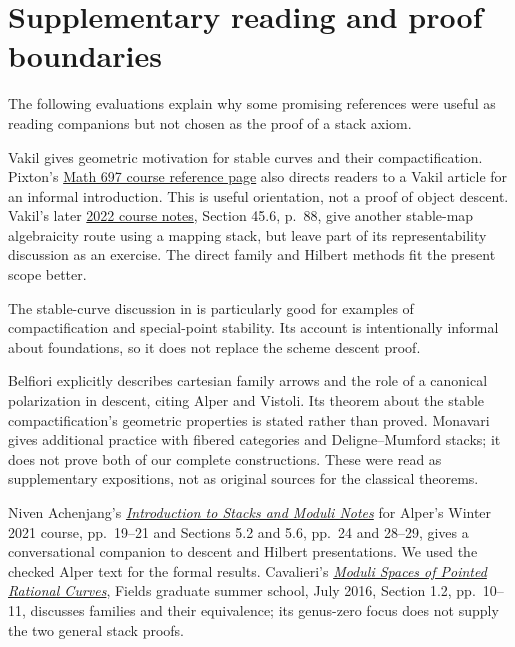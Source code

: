 \section{Supplementary reading and proof boundaries}\label{sec:reading-audit}

The following evaluations explain why some promising references
were useful as reading companions but not chosen as the proof
of a stack axiom.

\begin{description}[style=nextline]
\item[Vakil and the Pixton course lead.]
Vakil \cite[Sections 2.4--2.7, pp.~9--11]{Vakil} gives geometric
motivation for stable curves and their compactification.
Pixton's \href{https://public.websites.umich.edu/~pixton/classes/697-F22/index.html}{Math 697 course reference page}
also directs readers to a Vakil article for an informal introduction.
This is useful orientation, not a proof of object descent.
Vakil's later \href{https://math.stanford.edu/~vakil/22-245C/22-245Cnotes2022-05-17.pdf}{2022 course notes},
Section 45.6, p.~88, give another stable-map algebraicity route
using a mapping stack, but leave part of its representability
discussion as an exercise. The direct family and Hilbert methods
fit the present scope better.

\item[Zvonkine.]
The stable-curve discussion in
\cite[Section 1.4, pp.~14--18]{Zvonkine} is particularly good
for examples of compactification and special-point stability.
Its account is intentionally informal about foundations, so
it does not replace the scheme descent proof.

\item[Student expositions.]
Belfiori \cite[Section 1.1, pp.~2--5]{Belfiori} explicitly
describes cartesian family arrows and the role of a canonical
polarization in descent, citing Alper and Vistoli. Its theorem
about the stable compactification's geometric properties is
stated rather than proved. Monavari
\cite[Sections 1.2--1.3, pp.~11--16]{Monavari} gives additional
practice with fibered categories and Deligne--Mumford stacks;
it does not prove both of our complete constructions.
These were read as supplementary expositions, not as original
sources for the classical theorems.

Niven Achenjang's \href{https://people.math.harvard.edu/~achenjang/assets/pdf/UW__Math_582C_Notes.pdf}{\emph{Introduction to Stacks and Moduli Notes}}
for Alper's Winter 2021 course, pp.~19--21 and Sections 5.2
and 5.6, pp.~24 and 28--29, gives a conversational companion
to descent and Hilbert presentations. We used the checked
Alper text for the formal results. Cavalieri's
\href{https://www.math.colostate.edu/~renzo/teaching/Moduli16/Fields.pdf}{\emph{Moduli Spaces of Pointed Rational Curves}},
Fields graduate summer school, July 2016, Section 1.2,
pp.~10--11, discusses families and their equivalence; its
genus-zero focus does not supply the two general stack proofs.


\end{description}
